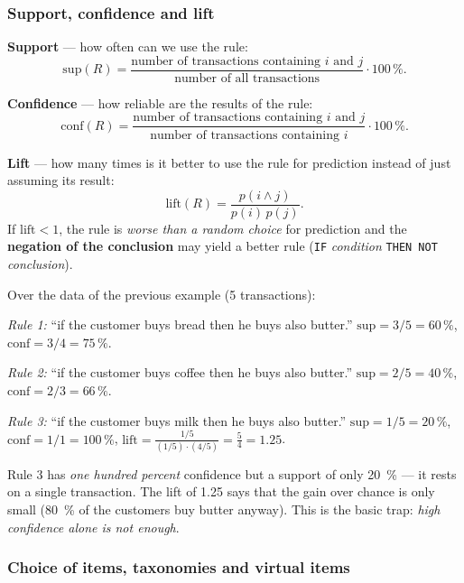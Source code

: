 \documentclass[11pt,a4paper]{article}
\theoremstyle{definition}
\providecommand{\uv}[1]{``#1''}
\begin{document}
\subsubsection{Support, confidence and lift}

\begin{defbox}
\textbf{Support} --- how often can we use the rule:
\[ \mathrm{sup}(R)=\frac{\text{number of transactions containing } i \text{ and } j}
   {\text{number of all transactions}}\cdot 100\,\%. \]

\textbf{Confidence} --- how reliable are the results of the rule:
\[ \mathrm{conf}(R)=\frac{\text{number of transactions containing } i \text{ and } j}
   {\text{number of transactions containing } i}\cdot 100\,\%. \]

\textbf{Lift} --- how many times is it better to use the rule for prediction instead of just
assuming its result:
\[ \mathrm{lift}(R)=\frac{p(i\wedge j)}{p(i)\,p(j)}. \]
If $\mathrm{lift}<1$, the rule is \emph{worse than a random choice} for prediction and the
\textbf{negation of the conclusion} may yield a better rule (\texttt{IF} \emph{condition}
\texttt{THEN NOT} \emph{conclusion}).
\end{defbox}

\begin{defbox}
Over the data of the previous example (5 transactions):

\emph{Rule 1:} \uv{if the customer buys bread then he buys also butter.}
$\mathrm{sup}=3/5=60\,\%$, $\mathrm{conf}=3/4=75\,\%$.

\emph{Rule 2:} \uv{if the customer buys coffee then he buys also butter.}
$\mathrm{sup}=2/5=40\,\%$, $\mathrm{conf}=2/3=66\,\%$.

\emph{Rule 3:} \uv{if the customer buys milk then he buys also butter.}
$\mathrm{sup}=1/5=20\,\%$, $\mathrm{conf}=1/1=100\,\%$,
$\mathrm{lift}=\frac{1/5}{(1/5)\cdot(4/5)}=\frac54=1.25$.

Rule 3 has \emph{one hundred percent} confidence but a support of only 20~\% --- it rests on a
single transaction. The lift of 1.25 says that the gain over chance is only small (80~\% of the
customers buy butter anyway). This is the basic trap: \emph{high confidence alone is not enough}.
\end{defbox}

\subsubsection{Choice of items, taxonomies and virtual items}
\end{document}
